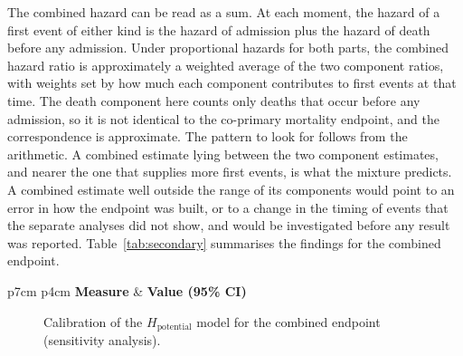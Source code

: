 The combined hazard can be read as a sum. At each moment, the hazard of a first event of either kind is the hazard of admission plus the hazard of death before any admission. Under proportional hazards for both parts, the combined hazard ratio is approximately a weighted average of the two component ratios, with weights set by how much each component contributes to first events at that time. The death component here counts only deaths that occur before any admission, so it is not identical to the co-primary mortality endpoint, and the correspondence is approximate. The pattern to look for follows from the arithmetic. A combined estimate lying between the two component estimates, and nearer the one that supplies more first events, is what the mixture predicts. A combined estimate well outside the range of its components would point to an error in how the endpoint was built, or to a change in the timing of events that the separate analyses did not show, and would be investigated before any result was reported. Table~\ref{tab:secondary} summarises the findings for the combined endpoint.

\begin{table}[htbp]
\centering
\caption{Performance of the $H_{\text{potential}}$ for the combined endpoint (sensitivity analysis).}
\label{tab:secondary}
\footnotesize
\renewcommand{\arraystretch}{1.2}
\begin{tabular}{p{7cm} p{4cm}}
\toprule
\textbf{Measure} & \textbf{Value (95\% CI)} \\
\midrule
{}
\bottomrule
\end{tabular}
\end{table}

\begin{figure}[htbp]
\centering
{}
\captionsetup{justification=justified, width=\linewidth}
\caption{Calibration of the $H_{\text{potential}}$ model for the combined endpoint (sensitivity analysis).}
\label{fig:calibration_secondary}
\end{figure}

